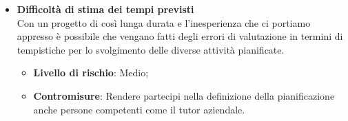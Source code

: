\begin{itemize}
\begin{itemize}
	\end{itemize}
	\item \textbf{Difficoltà di stima dei tempi previsti}\\
	Con un progetto di così lunga durata e l'inesperienza che ci portiamo appresso è possibile che vengano fatti degli errori di valutazione in termini di tempistiche per lo svolgimento delle diverse attività pianificate.
	\begin{itemize}
		\item \textbf{Livello di rischio}: Medio;
		\item \textbf{Contromisure}: Rendere partecipi nella definizione della pianificazione anche persone competenti come il tutor aziendale.
	\end{itemize}
\end{itemize}

